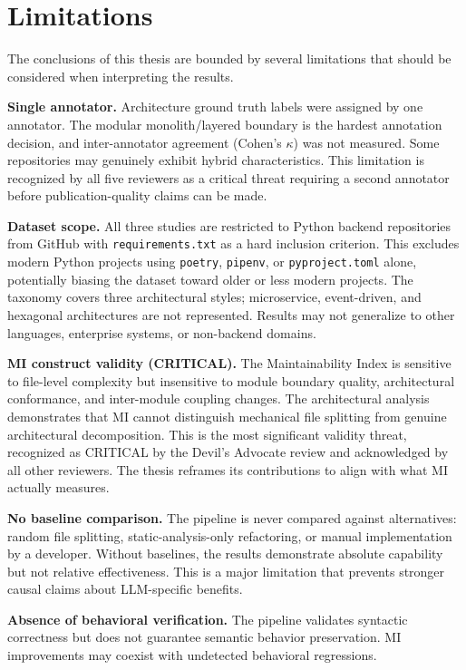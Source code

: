 \section{Limitations}

The conclusions of this thesis are bounded by several limitations that should be considered when interpreting the results.

\textbf{Single annotator.} Architecture ground truth labels were assigned by one annotator. The modular monolith/layered boundary is the hardest annotation decision, and inter-annotator agreement (Cohen's $\kappa$) was not measured. Some repositories may genuinely exhibit hybrid characteristics. This limitation is recognized by all five reviewers as a critical threat requiring a second annotator before publication-quality claims can be made.

\textbf{Dataset scope.} All three studies are restricted to Python backend repositories from GitHub with \texttt{requirements.txt} as a hard inclusion criterion. This excludes modern Python projects using \texttt{poetry}, \texttt{pipenv}, or \texttt{pyproject.toml} alone, potentially biasing the dataset toward older or less modern projects. The taxonomy covers three architectural styles; microservice, event-driven, and hexagonal architectures are not represented. Results may not generalize to other languages, enterprise systems, or non-backend domains.

\textbf{MI construct validity (CRITICAL).} The Maintainability Index is sensitive to file-level complexity but insensitive to module boundary quality, architectural conformance, and inter-module coupling changes. The architectural analysis demonstrates that MI cannot distinguish mechanical file splitting from genuine architectural decomposition. This is the most significant validity threat, recognized as CRITICAL by the Devil's Advocate review and acknowledged by all other reviewers. The thesis reframes its contributions to align with what MI actually measures.

\textbf{No baseline comparison.} The pipeline is never compared against alternatives: random file splitting, static-analysis-only refactoring, or manual implementation by a developer. Without baselines, the results demonstrate absolute capability but not relative effectiveness. This is a major limitation that prevents stronger causal claims about LLM-specific benefits.

\textbf{Absence of behavioral verification.} The pipeline validates syntactic correctness but does not guarantee semantic behavior preservation. MI improvements may coexist with undetected behavioral regressions.

